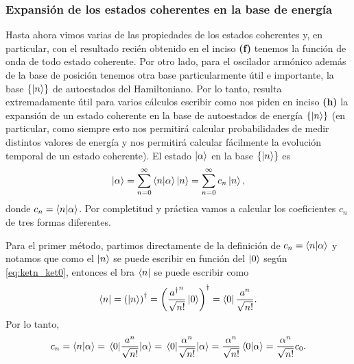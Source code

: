 \documentclass[10pt, a4paper]{article}
\numberwithin{equation}{subsection}
\begin{document}
\subsubsection{Expansión de los estados coherentes en la base de energía}

Hasta ahora vimos varias de las propiedades de los estados coherentes y, en
particular, con el resultado recién obtenido en el inciso \textbf{(f)} tenemos
la función de onda de todo estado coherente. Por otro lado, para el oscilador
armónico además de la base de posición tenemos otra base particularmente útil
e importante, la base $\set{\ket{n}}$ de autoestados del Hamiltoniano. Por lo
tanto, resulta extremadamente útil para varios cálculos escribir como nos piden
en inciso \textbf{(h)} la expansión de un estado coherente en la base de
autoestados de energía $\set{\ket{n}}$ (en particular, como siempre esto nos
permitirá calcular probabilidades de medir distintos valores de energía y nos
permitirá calcular fácilmente la evolución temporal de un estado coherente).
El estado $\ket{\alpha}$ en la base $\set{\ket{n}}$ es
\begin{equation}
  \ket{\alpha} = \sum_{n=0}^{\infty} \braket{n}{\alpha} \ket{n}
    = \sum_{n=0}^{\infty} c_n \ket{n},
\end{equation}
donde $c_n = \braket{n}{\alpha}$. Por completitud y práctica vamos a calcular
los coeficientes $c_n$ de tres formas diferentes.

\bigbreak

Para el primer método, partimos directamente de la definición de $c_n =
\braket{n}{\alpha}$ y notamos que como el $\ket{n}$ se puede escribir en
función del $\ket{0}$ según \eqref{eq:ketn_ket0}, entonces el bra $\bra{n}$ se
puede escribir como
\begin{equation}
  \bra{n} = \left(\ket{n}\right)^\dagger =
  \left(\frac{{a^\dagger}^n}{\sqrt{n!}}\ket{0}\right)^\dagger =
  \bra{0}\frac{a^n}{\sqrt{n!}}.
\end{equation}
Por lo tanto,
\begin{equation} \label{eq:alpha_cn_c0}
  c_n = \braket{n}{\alpha} = \matrixel{0}{\frac{a^n}{\sqrt{n!}}}{\alpha}
    = \matrixel{0}{\frac{\alpha^n}{\sqrt{n!}}}{\alpha} =
    \frac{\alpha^n}{\sqrt{n!}}\braket{0}{\alpha} =
    \frac{\alpha^n}{\sqrt{n!}}c_0.
\end{equation}

\end{document}
